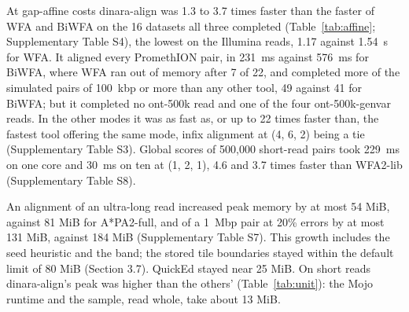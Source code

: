 At gap-affine costs dinara-align was 1.3 to 3.7 times faster than the faster of WFA and BiWFA on the 16 datasets all three completed (Table~\ref{tab:affine}; Supplementary Table S4), the lowest on the Illumina reads, 1.17 against 1.54~\textmu s for WFA. It aligned every PromethION pair, in 231~ms against 576~ms for BiWFA, where WFA ran out of memory after 7 of 22, and completed more of the simulated pairs of 100~kbp or more than any other tool, 49 against 41 for BiWFA; but it completed no ont-500k read and one of the four ont-500k-genvar reads. In the other modes it was as fast as, or up to 22 times faster than, the fastest tool offering the same mode, infix alignment at (4, 6, 2) being a tie (Supplementary Table S3). Global scores of 500{,}000 short-read pairs took 229~ms on one core and 30~ms on ten at (1, 2, 1), 4.6 and 3.7 times faster than WFA2-lib (Supplementary Table S8).







An alignment of an ultra-long read increased peak memory by at most 54 MiB, against 81 MiB for A*PA2-full, and of a 1~Mbp pair at 20\% errors by at most 131 MiB, against 184 MiB (Supplementary Table S7). This growth includes the seed heuristic and the band; the stored tile boundaries stayed within the default limit of 80 MiB (Section 3.7). QuickEd stayed near 25 MiB. On short reads dinara-align's peak was higher than the others' (Table~\ref{tab:unit}): the Mojo runtime and the sample, read whole, take about 13 MiB.

